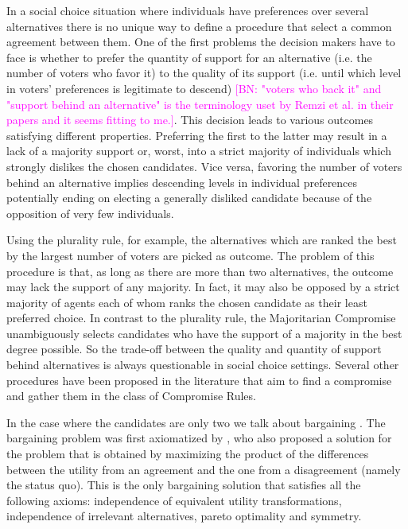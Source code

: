 \documentclass[version=3.21, pagesize, notitlepage, twoside=off, bibliography=totoc, DIV=calc, fontsize=12pt, a4paper]{scrartcl}
\newcommand{\commentBN}[1]{\textcolor{magenta}{\small$\big[$BN: #1$\big]$}}
\begin{document}
In a social choice situation where individuals have preferences over several alternatives there is no unique way to define a procedure that select a common agreement between them. One of the first problems the decision makers have to face is whether to prefer the quantity of support for an alternative (i.e. the number of voters who favor it) to the quality of its support (i.e. until which level in voters’ preferences is legitimate to descend) \commentBN{"voters who back it" and "support behind an alternative" is the terminology uset by Remzi et al. in their papers and it seems fitting to me.}. This decision leads to various outcomes satisfying different properties. Preferring the first to the latter may result in a lack of a majority support or, worst, into a strict majority of individuals which strongly dislikes the chosen candidates. Vice versa, favoring the number of voters behind an alternative implies descending levels in individual preferences potentially ending on electing a generally disliked candidate because of the opposition of very few individuals. 

Using the plurality rule, for example, the alternatives which are ranked the best by the largest number of voters are picked as outcome. The problem of this procedure is that, as long as there are more than two alternatives, the outcome may lack the support of any majority. In fact, it may also be opposed by a strict majority of agents each of whom ranks the chosen candidate as their least preferred choice. In contrast to the plurality rule, the Majoritarian Compromise \citep{Sertel1999} unambiguously selects candidates who have the support of a majority in the best degree possible. So the trade-off between the quality and quantity of support behind alternatives is always questionable in social choice settings. Several other procedures have been proposed in the literature that aim to find a compromise and \citet{Merlin2019} gather them in the class of Compromise Rules.

In the case where the candidates are only two we talk about bargaining \citep{Thomson1994}. The bargaining problem was first axiomatized by \citet{Nash1950}, who also proposed a solution for the problem that is obtained by maximizing the product of the differences between the utility from an agreement and the one from a disagreement (namely the status quo). This is the only bargaining solution that satisfies all the following axioms: independence of equivalent utility transformations, independence of irrelevant alternatives, pareto optimality and symmetry.
	
\end{document}
